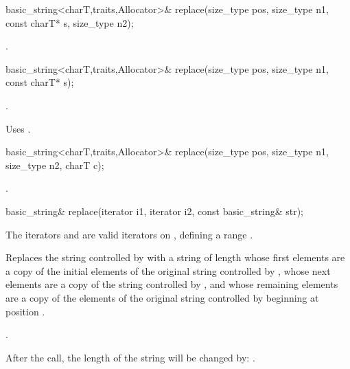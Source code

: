 %
%
\begin{itemdecl}
basic_string<charT,traits,Allocator>&
  replace(size_type pos, size_type n1, const charT* s, size_type n2);
\end{itemdecl}

\begin{itemdescr}
\pnum
\returns
{}.
\end{itemdescr}

%
%
\begin{itemdecl}
basic_string<charT,traits,Allocator>&
  replace(size_type pos, size_type n1, const charT* s);
\end{itemdecl}

\begin{itemdescr}
\pnum
\returns
{}.

\pnum
\notes
Uses .
\end{itemdescr}

%
%
\begin{itemdecl}
basic_string<charT,traits,Allocator>&
  replace(size_type pos, size_type n1,
          size_type n2, charT c);
\end{itemdecl}

\begin{itemdescr}
\pnum
\returns
{}.
\end{itemdescr}

%
%
\begin{itemdecl}
basic_string& replace(iterator i1, iterator i2, const basic_string& str);
\end{itemdecl}

\begin{itemdescr}
\pnum
\requires
The iterators  and  are valid iterators on ,
defining a range \tcode{[i1,i2)}.

\pnum
\effects
Replaces the string controlled by  with a string of length
 whose first 
elements are a copy of the initial elements of the original string controlled
by , whose next  elements are a copy of the
string controlled by , and whose remaining elements are a copy
of the elements of the original string controlled by  beginning
at position .

\pnum
\returns
{}.

\pnum
\notes
After the call, the length of the string will be changed by:
.
\end{itemdescr}

